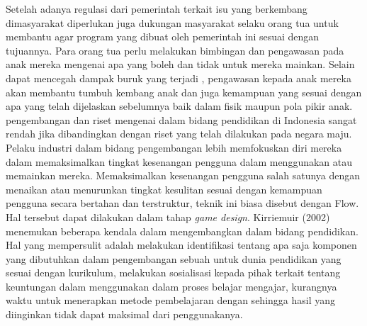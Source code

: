 Setelah adanya regulasi dari pemerintah terkait isu yang berkembang dimasyarakat diperlukan juga dukungan masyarakat selaku orang tua untuk membantu agar program yang dibuat oleh pemerintah ini sesuai dengan tujuannya. Para orang tua perlu melakukan bimbingan dan pengawasan pada anak mereka mengenai \game apa yang boleh dan tidak untuk mereka mainkan. Selain dapat mencegah dampak buruk yang terjadi , pengawasan kepada anak mereka akan membantu tumbuh kembang anak dan juga kemampuan yang sesuai dengan apa yang telah dijelaskan sebelumnya baik dalam fisik maupun pola pikir anak.
\linebreak\linebreak
pengembangan dan riset mengenai \game dalam bidang pendidikan di Indonesia sangat rendah jika dibandingkan dengan riset yang telah dilakukan pada negara maju. Pelaku industri dalam bidang pengembangan \game lebih memfokuskan diri mereka dalam memaksimalkan tingkat kesenangan pengguna dalam menggunakan atau memainkan \game mereka. Memaksimalkan kesenangan pengguna salah satunya dengan menaikan atau menurunkan tingkat kesulitan sesuai dengan kemampuan pengguna secara bertahan dan terstruktur, teknik ini biasa disebut dengan Flow. Hal tersebut dapat dilakukan dalam tahap \textit{game design}.
\linebreak\linebreak
Kirriemuir (2002) menemukan beberapa kendala dalam mengembangkan \game dalam bidang pendidikan. Hal yang mempersulit adalah melakukan identifikasi tentang apa saja komponen yang dibutuhkan dalam pengembangan sebuah \game untuk dunia pendidikan yang sesuai dengan kurikulum, melakukan sosialisasi kepada pihak terkait tentang keuntungan dalam menggunakan \game dalam proses belajar mengajar, kurangnya waktu untuk menerapkan metode pembelajaran dengan \game sehingga hasil yang diinginkan tidak dapat maksimal dari penggunakanya.
\linebreak\linebreak




